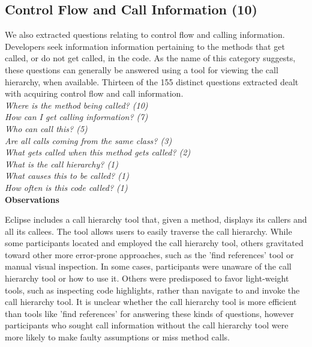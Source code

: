 \documentclass[conference]{IEEEtran}
\begin{document}

\noindent\subsection{\textbf{Control Flow and Call Information (10)}}\label{cf}

We also extracted questions relating to control flow and calling information. 
Developers seek information information pertaining to the methods that get called, or do not get called, in the code. 
As the name of this category suggests, these questions can generally be answered using a tool for viewing the call hierarchy, when available. 
Thirteen of the 155 distinct questions extracted dealt with acquiring control flow and call information.
\\


\noindent\emph{Where is the method being called? (10)} \\
\emph{How can I get calling information? (7)} \\
\emph{Who can call this? (5)} \\
\emph{Are all calls coming from the same class? (3)} \\
\emph{What gets called when this method gets called? (2)} \\
\emph{What is the call hierarchy? (1)} \\
\emph{What causes this to be called? (1)} \\
\emph{How often is this code called? (1)} \\


\noindent\textbf{Observations}

Eclipse includes a call hierarchy tool that, given a method, displays its callers and all its callees. 
The tool allows users to easily traverse the call hierarchy. 
While some participants located and employed the call hierarchy tool, others gravitated toward other more error-prone approaches, such as the 'find references' tool or manual visual inspection. 
In some cases, participants were unaware of the call hierarchy tool or how to use it. 
Others were predisposed to favor light-weight tools, such as inspecting code highlights, rather than navigate to and invoke the call hierarchy tool.
It is unclear whether the call hierarchy tool is more efficient than tools like 'find references' for answering these kinds of questions, however participants who sought call information without the call hierarchy tool were more likely to make faulty assumptions or miss method calls. 
\end{document}
